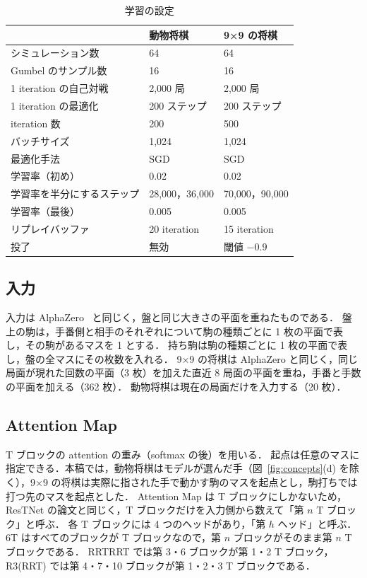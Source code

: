 \documentclass[submit]{ipsj}
\begin{document}
\begin{table}[tb]
  \centering\footnotesize
  \caption{学習の設定}
  \label{tab:train}
  \begin{tabular}{lll}
    \toprule
    & 動物将棋 & 9×9 の将棋 \\
    \midrule
    シミュレーション数 & 64 & 64 \\
    Gumbel のサンプル数 & 16 & 16 \\
    1 iteration の自己対戦 & 2,000 局 & 2,000 局 \\
    1 iteration の最適化 & 200 ステップ & 200 ステップ \\
    iteration 数 & 200 & 500 \\
    バッチサイズ & 1,024 & 1,024 \\
    最適化手法 & SGD & SGD \\
    学習率（初め） & 0.02 & 0.02 \\
    学習率を半分にするステップ & 28,000，36,000 & 70,000，90,000 \\
    学習率（最後） & 0.005 & 0.005 \\
    リプレイバッファ & 20 iteration & 15 iteration \\
    投了 & 無効 & 閾値 $-0.9$ \\
    \bottomrule
  \end{tabular}
\end{table}

\subsection{入力}
\label{sec:input}
入力は AlphaZero~\cite{alphazero} と同じく，盤と同じ大きさの平面を重ねたものである．
盤上の駒は，手番側と相手のそれぞれについて駒の種類ごとに 1 枚の平面で表し，その駒があるマスを 1 とする．
持ち駒は駒の種類ごとに 1 枚の平面で表し，盤の全マスにその枚数を入れる．
9×9 の将棋は AlphaZero と同じく，同じ局面が現れた回数の平面（3 枚）を加えた直近 8 局面の平面を重ね，手番と手数の平面を加える（362 枚）．
動物将棋は現在の局面だけを入力する（20 枚）．

\subsection{Attention Map}
\label{sec:attn}
T ブロックの attention の重み（softmax の後）を用いる．
起点は任意のマスに指定できる．本稿では，動物将棋はモデルが選んだ手（図~\ref{fig:concepts}(d) を除く），9×9 の将棋は実際に指された手で動かす駒のマスを起点とし，駒打ちでは打つ先のマスを起点とした．
Attention Map は T ブロックにしかないため，ResTNet の論文と同じく，T ブロックだけを入力側から数えて「第 $n$ T ブロック」と呼ぶ．
各 T ブロックには 4 つのヘッドがあり，「第 $h$ ヘッド」と呼ぶ．
6T はすべてのブロックが T ブロックなので，第 $n$ ブロックがそのまま第 $n$ T ブロックである．
RRTRRT では第 3・6 ブロックが第 1・2 T ブロック，R3(RRT) では第 4・7・10 ブロックが第 1・2・3 T ブロックである．
\end{document}
